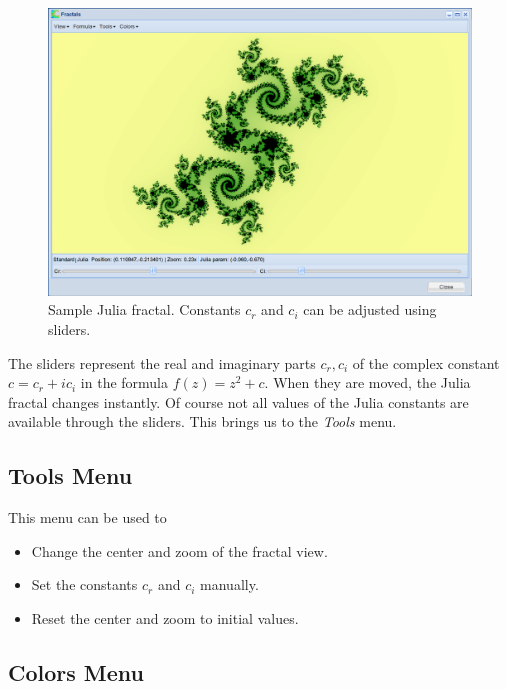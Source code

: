 \documentclass{article}
\begin{document}
\begin{figure}[!ht]
\begin{center}
\includegraphics[width=\textwidth]{img/julia-1.png}
\end{center}
\caption{Sample Julia fractal. Constants $c_r$ and $c_i$ can be adjusted using sliders.}
\label{fig:jul-1}
\end{figure}

\noindent
The sliders represent the real and imaginary parts $c_r, c_i$ of the complex constant 
$c = c_r + i c_i$ in the formula $f(z) = z^2 + c$. When they are moved, the Julia 
fractal changes instantly. Of course not all values of the Julia constants are 
available through the sliders. This brings us to the {\em Tools} menu.

\subsection{Tools Menu}

This menu can be used to

\begin{itemize} 
\item Change the center and zoom of the fractal view. 
\item Set the constants $c_r$ and $c_i$ manually.
\item Reset the center and zoom to initial values.
\end{itemize}

\subsection{Colors Menu}
\end{document}

